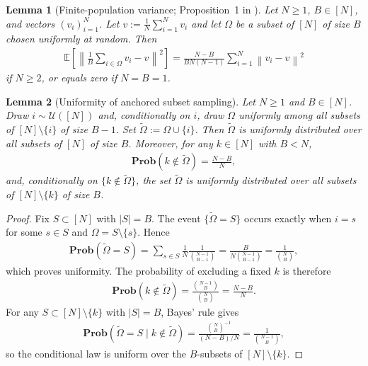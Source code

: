 \documentclass{article}
\newcommand{\bb}{\mathbb}
\newcommand{\sqn}[1]{\left\| #1 \right\|^2}
\newcommand{\eqdef}{:=}
\newcommand{\Prob}{\mathbf{Prob}}
\newcommand{\Exp}[1]{{\bb E}\left[#1\right]}
\theoremstyle{plain}
\newtheorem{lemma}{Lemma}
\begin{document}
\begin{lemma}[Finite-population variance; Proposition~1 in \citep{con22mu}]\label{lem:prop1}
Let $N\geq 1$, $B\in [N]$, and vectors $(v_i)_{i=1}^N$. Let $v\eqdef \frac{1}{N}\sum_{i=1}^N v_i$ and let $\Omega$ be a subset of $[N]$ of size $B$ chosen uniformly at random.
Then 
\begin{align}
\Exp{\sqn{\frac{1}{B}\sum_{i\in\Omega}v_i-v}}=\frac{N-B}{BN(N-1)}\sum_{i=1}^N \sqn{v_i-v}
\end{align}
if $N\geq 2$, or equals zero if $N=B=1$.
\end{lemma}

\begin{lemma}[Uniformity of anchored subset sampling]\label{lem:anchored_subset_uniform}
Let $N\geq 1$ and $B\in[N]$. Draw $i\sim\mathcal{U}([N])$ and, conditionally on $i$, draw $\Omega$ uniformly among all subsets of $[N]\setminus\{i\}$ of size $B-1$. Set $\tilde{\Omega}\eqdef \Omega\cup\{i\}$. Then $\tilde{\Omega}$ is uniformly distributed over all subsets of $[N]$ of size $B$.
Moreover, for any $k\in[N]$ with $B<N$,
\begin{align*}
\Prob(k\notin\tilde{\Omega})=\frac{N-B}{N},
\end{align*}
and, conditionally on $\{k\notin\tilde{\Omega}\}$, the set $\tilde{\Omega}$ is uniformly distributed over all subsets of $[N]\setminus\{k\}$ of size $B$.
\end{lemma}
\begin{proof}
Fix $S\subset[N]$ with $|S|=B$. The event $\{\tilde{\Omega}=S\}$ occurs exactly when $i=s$ for some $s\in S$ and $\Omega=S\setminus\{s\}$. Hence
\begin{align*}
\Prob(\tilde{\Omega}=S)
=\sum_{s\in S}\frac{1}{N}\frac{1}{\binom{N-1}{B-1}}
=\frac{B}{N\binom{N-1}{B-1}}
=\frac{1}{\binom{N}{B}},
\end{align*}
which proves uniformity. The probability of excluding a fixed $k$ is therefore
\begin{align*}
\Prob(k\notin\tilde{\Omega})
=\frac{\binom{N-1}{B}}{\binom{N}{B}}
=\frac{N-B}{N}.
\end{align*}
For any $S\subset[N]\setminus\{k\}$ with $|S|=B$, Bayes' rule gives
\begin{align*}
\Prob(\tilde{\Omega}=S\mid k\notin\tilde{\Omega})
=\frac{\binom{N}{B}^{-1}}{(N-B)/N}
=\frac{1}{\binom{N-1}{B}},
\end{align*}
so the conditional law is uniform over the $B$-subsets of $[N]\setminus\{k\}$.
\end{proof}
\end{document}
